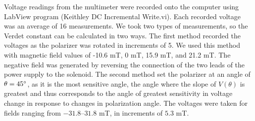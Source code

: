 \documentclass[prb,preprint]{revtex4-1}
\begin{document}
{Voltage readings from the multimeter were recorded onto the computer using LabView program (Keithley DC Incremental Write.vi). Each recorded voltage was an average of 16 measurements. We took two types of measurements, so the Verdet constant can be calculated in two ways.  The first method recorded the voltages as the polarizer was rotated in increments of 5\degree. We used this method with magnetic field values of -10.6 mT, 0 mT, 15.9 mT, and 21.2 mT. The negative field was generated by reversing the connection of the two leads of the power supply to the solenoid. The second method set the polarizer at an angle of $\theta = 45\degree$, as it is the most sensitive angle, the angle where the slope of $V(\theta)$ is greatest and thus corresponds to the angle of greatest sensitivity in voltage change in response to changes in polarization angle. The voltages were taken for fields ranging from $-31.8$--$31.8$ mT, in increments of $5.3$ mT.
}
\end{document}
